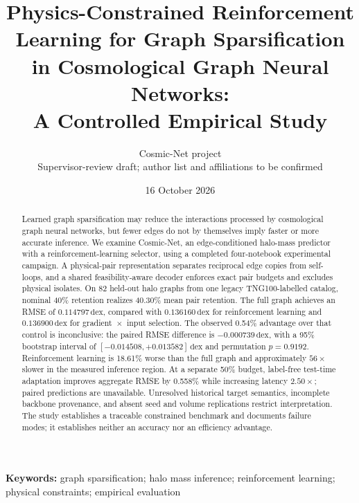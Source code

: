\documentclass[10pt,twocolumn,letterpaper]{article}
\title{Physics-Constrained Reinforcement Learning for Graph Sparsification in Cosmological Graph Neural Networks:\\A Controlled Empirical Study}
\author{Cosmic-Net project\\\small Supervisor-review draft; author list and affiliations to be confirmed}
\date{16 October 2026}
\newcommand{\dex}{\,\mathrm{dex}}
\begin{document}
\maketitle
\begin{abstract}
Learned graph sparsification may reduce the interactions processed by cosmological graph neural networks, but fewer edges do not by themselves imply faster or more accurate inference. We examine Cosmic-Net, an edge-conditioned halo-mass predictor with a reinforcement-learning selector, using a completed four-notebook experimental campaign. A physical-pair representation separates reciprocal edge copies from self-loops, and a shared feasibility-aware decoder enforces exact pair budgets and excludes physical isolates. On 82 held-out halo graphs from one legacy TNG100-labelled catalog, nominal 40\% retention realizes 40.30\% mean pair retention. The full graph achieves an RMSE of $0.114797\dex$, compared with $0.136160\dex$ for reinforcement learning and $0.136900\dex$ for gradient~$\times$~input selection. The observed 0.54\% advantage over that control is inconclusive: the paired RMSE difference is $-0.000739\dex$, with a 95\% bootstrap interval of $[-0.014508,+0.013582]\dex$ and permutation $p=0.9192$. Reinforcement learning is 18.61\% worse than the full graph and approximately $56\times$ slower in the measured inference region. At a separate 50\% budget, label-free test-time adaptation improves aggregate RMSE by 0.558\% while increasing latency $2.50\times$; paired predictions are unavailable. Unresolved historical target semantics, incomplete backbone provenance, and absent seed and volume replications restrict interpretation. The study establishes a traceable constrained benchmark and documents failure modes; it establishes neither an accuracy nor an efficiency advantage.
\end{abstract}
\noindent\textbf{Keywords:} graph sparsification; halo mass inference; reinforcement learning; physical constraints; empirical evaluation










\label{page:main-end}
\clearpage


\clearpage
\onecolumn
\appendix

\end{document}
